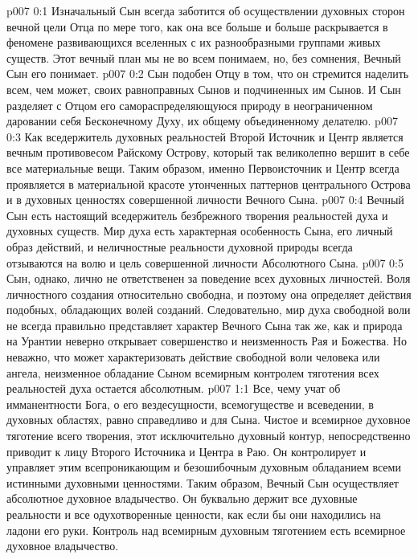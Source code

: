 \author{Божественный Советник}
\vs p007 0:1 Изначальный Сын всегда заботится об осуществлении духовных сторон вечной цели Отца по мере того, как она все больше и больше раскрывается в феномене развивающихся вселенных с их разнообразными группами живых существ. Этот вечный план мы не во всем понимаем, но, без сомнения, Вечный Сын его понимает.
\vs p007 0:2 Сын подобен Отцу в том, что он стремится наделить всем, чем может, своих равноправных Сынов и подчиненных им Сынов. И Сын разделяет с Отцом его самораспределяющуюся природу в неограниченном даровании себя Бесконечному Духу, их общему объединенному делателю.
\vs p007 0:3 \pc Как вседержитель духовных реальностей Второй Источник и Центр является вечным противовесом Райскому Острову, который так великолепно вершит в себе все материальные вещи. Таким образом, именно Первоисточник и Центр всегда проявляется в материальной красоте утонченных паттернов центрального Острова и в духовных ценностях совершенной личности Вечного Сына.
\vs p007 0:4 \pc Вечный Сын есть настоящий вседержитель безбрежного творения реальностей духа и духовных существ. Мир духа есть характерная особенность Сына, его личный образ действий, и неличностные реальности духовной природы всегда отзываются на волю и цель совершенной личности Абсолютного Сына.
\vs p007 0:5 Сын, однако, лично не ответственен за поведение всех духовных личностей. Воля личностного создания относительно свободна, и поэтому она определяет действия подобных, обладающих волей созданий. Следовательно, мир духа свободной воли не всегда правильно представляет характер Вечного Сына так же, как и природа на Урантии неверно открывает совершенство и неизменность Рая и Божества. Но неважно, что может характеризовать действие свободной воли человека или ангела, неизменное обладание Сыном всемирным контролем тяготения всех реальностей духа остается абсолютным.
\vs p007 1:1 Все, чему учат об имманентности Бога, о его вездесущности, всемогуществе и всеведении, в духовных областях, равно справедливо и для Сына. Чистое и всемирное духовное тяготение всего творения, этот исключительно духовный контур, непосредственно приводит к лицу Второго Источника и Центра в Раю. Он контролирует и управляет этим всепроникающим и безошибочным духовным обладанием всеми истинными духовными ценностями. Таким образом, Вечный Сын осуществляет абсолютное духовное владычество. Он буквально держит все духовные реальности и все одухотворенные ценности, как если бы они находились на ладони его руки. Контроль над всемирным духовным тяготением есть всемирное духовное владычество.
